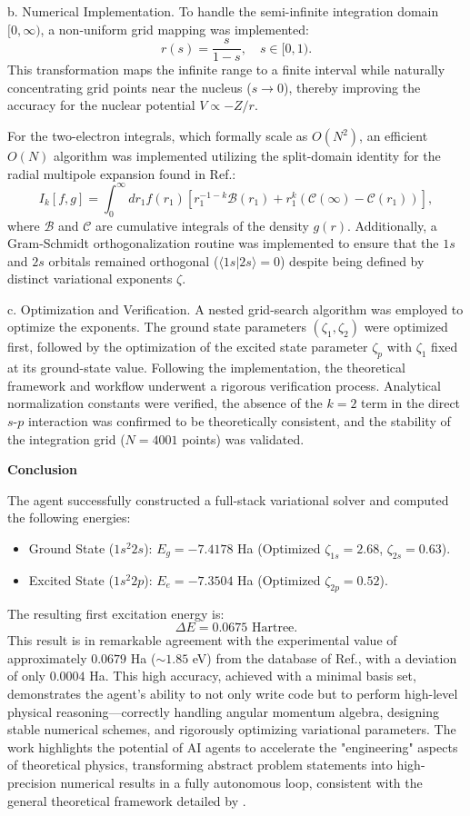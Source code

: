 \documentclass[11pt, a4paper, logo, copyright, nonumbering]{SAI}
\begin{document}
\medskip
{b. Numerical Implementation.}
To handle the semi-infinite integration domain $[0, \infty)$, a non-uniform grid mapping was implemented:
\[
    r(s) = \frac{s}{1-s}, \quad s \in [0, 1).
\]
This transformation maps the infinite range to a finite interval while naturally concentrating grid points near the nucleus ($s \to 0$), thereby improving the accuracy for the nuclear potential $V \propto -Z/r$.

For the two-electron integrals, which formally scale as $O(N^2)$, an efficient $O(N)$ algorithm was implemented utilizing the split-domain identity for the radial multipole expansion found in Ref.\cite{Szabo:1996}:
\[
    I_k[f,g] = \int_0^\infty dr_1 f(r_1) \left[ r_1^{-1-k} \mathcal{B}(r_1) + r_1^k (\mathcal{C}(\infty) - \mathcal{C}(r_1)) \right],
\]
where $\mathcal{B}$ and $\mathcal{C}$ are cumulative integrals of the density $g(r)$. 
Additionally, a Gram-Schmidt orthogonalization routine was implemented to ensure that the $1s$ and $2s$ orbitals remained orthogonal ($\langle 1s | 2s \rangle = 0$) despite being defined by distinct variational exponents $\zeta$.

\medskip
{c. Optimization and Verification.}
A nested grid-search algorithm was employed to optimize the exponents. 
The ground state parameters $(\zeta_1, \zeta_2)$ were optimized first, followed by the optimization of the excited state parameter $\zeta_p$ with $\zeta_1$ fixed at its ground-state value.
Following the implementation, the theoretical framework and workflow underwent a rigorous verification process. Analytical normalization constants were verified, the absence of the $k=2$ term in the direct $s$-$p$ interaction was confirmed to be theoretically consistent, and the stability of the integration grid ($N=4001$ points) was validated.

\noindent \textbf{Conclusion}

The agent successfully constructed a full-stack variational solver and computed the following energies:
\begin{itemize}
    \item Ground State ($1s^2 2s$): $E_g = -7.4178$ Ha (Optimized $\zeta_{1s}=2.68$, $\zeta_{2s}=0.63$).
    \item Excited State ($1s^2 2p$): $E_e = -7.3504$ Ha (Optimized $\zeta_{2p}=0.52$).
\end{itemize}
The resulting first excitation energy is:
\[
    \Delta E = 0.0675 \text{ Hartree}.
\]
This result is in remarkable agreement with the experimental value of approximately $0.0679$ Ha ($\sim 1.85$ eV) from the database of Ref.\cite{NIST_ASD}, with a deviation of only $0.0004$ Ha. 
This high accuracy, achieved with a minimal basis set, demonstrates the agent's ability to not only write code but to perform high-level physical reasoning—correctly handling angular momentum algebra, designing stable numerical schemes, and rigorously optimizing variational parameters. 
The work highlights the potential of AI agents to accelerate the "engineering" aspects of theoretical physics, transforming abstract problem statements into high-precision numerical results in a fully autonomous loop, consistent with the general theoretical framework detailed by \cite{sachdev2011quantum}.
\end{document}
